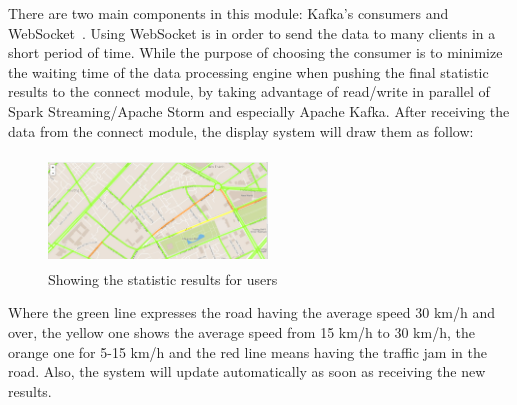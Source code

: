\documentclass{acm_proc_article-sp}
\begin{document}
There are two main components in this module: Kafka's consumers and WebSocket~\cite{websocket}. Using WebSocket is in order to send the data to many clients in a short period of time. While the purpose of choosing the consumer is to minimize the waiting time of the data processing engine when pushing the final statistic results to the connect module, by taking advantage of read/write in parallel of Spark Streaming/Apache Storm and especially Apache Kafka. After receiving the data from the connect module, the display system will draw them as follow:

	\begin{figure}[h]
		\centering
		\includegraphics[height=110px,width=220px]{Picture1}
		\caption{Showing the statistic results for users}
	\end{figure}

Where the green line expresses the road having the average speed 30 km/h and over, the yellow one shows the average speed from 15 km/h to 30 km/h, the orange one for 5-15 km/h and the red line means having the traffic jam in the road. Also, the system will update automatically as soon as receiving the new results.
\end{document}
